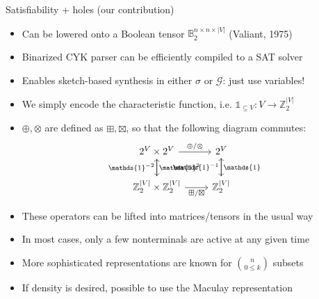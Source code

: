 \documentclass{beamer}
\begin{document}
\begin{frame}[fragile]{Satisfiability + holes (our contribution)}
  \begin{itemize}
    \item Can be lowered onto a Boolean tensor $\mathbb{B}_2^{n\times n \times |V|}$ (Valiant, 1975)
    \item Binarized CYK parser can be efficiently compiled to a SAT solver
    \item Enables sketch-based synthesis in either $\sigma$ or $\mathcal G$: just use variables!
    \item We simply encode the characteristic function, i.e. $\mathds{1}_{\subseteq V}: V\rightarrow \mathbb{Z}_2^{|V|}$
    \item $\oplus, \otimes$ are defined as $\boxplus, \boxtimes$, so that the following diagram commutes:
    \[\begin{tikzcd}
        2^V \times 2^V \arrow[r, "\oplus/\otimes"] \arrow[d, "\mathds{1}^2"]
        & 2^V \arrow[d, "\mathds{1}\phantom{^{-1}}"] \\
        \mathbb{Z}_2^{|V|} \times \mathbb{Z}_2^{|V|} \arrow[r, "\boxplus/\boxtimes", labels=below] \arrow[u, "\mathds{1}^{-2}"]
        & \mathbb{Z}_2^{|V|} \arrow[u, "\mathds{1}^{-1}"]
    \end{tikzcd}\]
    \item These operators can be lifted into matrices/tensors in the usual way
    \item In most cases, only a few nonterminals are active at any given time
    \item More sophisticated representations are known for $\binom{n}{0 \leq k}$ subsets
    \item If density is desired, possible to use the Maculay representation
  \end{itemize}
\end{frame}
\end{document}
